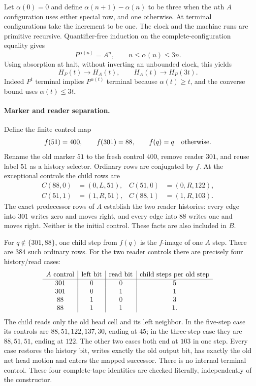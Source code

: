 Let $\alpha(0)=0$ and define $\alpha(n+1)-\alpha(n)$ to be three
when the $n$th $A$ configuration uses either special row, and one otherwise.
At terminal configurations take the increment to be one.
The clock and the machine runs are primitive recursive.  Quantifier-free
induction on the complete-configuration equality gives
\[
 P^{\alpha(n)}=A^n,
 \qquad n\le\alpha(n)\le3n.
\]
Using absorption at halt, without inverting an unbounded clock, this yields
\[
 H_P(t)\to H_A(t),\qquad H_A(t)\to H_P(3t).
 \tag{A}
\]
Indeed $P^t$ terminal implies $P^{\alpha(t)}$ terminal because
$\alpha(t)\ge t$, and the converse bound uses $\alpha(t)\le3t$.

\paragraph{Marker and reader separation.}
Define the finite control map
\[
 f(51)=400,\qquad f(301)=88,\qquad f(q)=q\quad\hbox{otherwise}.
\]
Rename the old marker $51$ to the fresh control $400$, remove reader
$301$, and reuse label $51$ as a history selector.  Ordinary rows are
conjugated by $f$.  At the exceptional controls the child rows are
\begin{align*}
 C(88,0)&=(0,L,51), & C(51,0)&=(0,R,122),\\
 C(51,1)&=(1,R,51), & C(88,1)&=(1,R,103).
\end{align*}
The exact predecessor rows of $A$ establish the two reader histories:
every edge into $301$ writes zero and moves right, and every edge into
$88$ writes one and moves right.  Neither is the initial control.  These
facts are also included in $B$.

For $q\notin\{301,88\}$, one child step from $f(q)$ is the $f$-image
of one $A$ step.  There are 384 such ordinary rows.  For the two reader
controls there are precisely four history/read cases:
\[
\begin{array}{c|c|c|c}
 A\hbox{ control}&\hbox{left bit}&\hbox{read bit}&
 \hbox{child steps per old step}\\\hline
301&0&0&5\\
301&0&1&1\\
88&1&0&3\\
88&1&1&1.
\end{array}
\]
The child reads only the old head cell and its left neighbor.  In the
five-step case its controls are $88,51,122,137,30$, ending at $45$;
in the three-step case they are $88,51,51$, ending at $122$.
The other two cases both end at $103$ in one step.  Every case restores
the history bit, writes exactly the old output bit, has exactly the old
net head motion and enters the mapped successor.  There is no internal
terminal control.  These four complete-tape identities are checked
literally, independently of the constructor.

